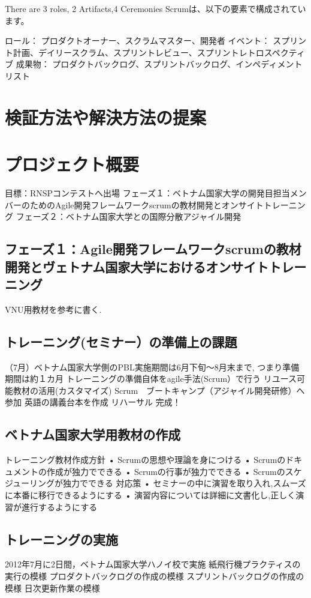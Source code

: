 \documentclass[paper]{jrsj}
\begin{document}
There are 3 roles, 2 Artifacts,4 Ceremonies
Scrumは、以下の要素で構成されています。

ロール： プロダクトオーナー、スクラムマスター、開発者 
イベント： スプリント計画、デイリースクラム、スプリントレビュー、スプリントレトロスペクティブ 
成果物： プロダクトバックログ、スプリントバックログ、インペディメントリスト

\section{検証方法や解決方法の提案}


\section{プロジェクト概要}
目標：RNSPコンテストへ出場
フェーズ１：ベトナム国家大学の開発目担当メンバーのためのAgile開発フレームワークscrumの教材開発とオンサイトトレーニング
フェーズ２：ベトナム国家大学との国際分散アジャイル開発

\subsection{フェーズ１：Agile開発フレームワークscrumの教材開発とヴェトナム国家大学におけるオンサイトトレーニング}
VNU用教材を参考に書く.

\subsection{トレーニング(セミナー）の準備上の課題}
（7月）ベトナム国家大学側のPBL実施期間は6月下旬～8月末まで, つまり準備期間は約１カ月
トレーニングの準備自体をagile手法(Scrum）で行う
リユース可能教材の活用(カスタマイズ)
Scrum　ブートキャンプ（アジャイル開発研修）へ参加
英語の講義台本を作成
リハーサル
完成！

\subsection{ベトナム国家大学用教材の作成}
トレーニング教材作成方針
•	Scrumの思想や理論を身につける
•	Scrumのドキュメントの作成が独力でできる
•	Scrumの行事が独力でできる
•	Scrumのスケジューリングが独力でできる
対応策
•	セミナーの中に演習を取り入れ,スムーズに本番に移行できるようにする
•	演習内容については詳細に文書化し,正しく演習が進行するようにする

\subsection{トレーニングの実施}
2012年7月に2日間，ベトナム国家大学ハノイ校で実施
紙飛行機プラクティスの実行の模様
プロダクトバックログの作成の模様
スプリントバックログの作成の模様
日次更新作業の模様
\end{document}

